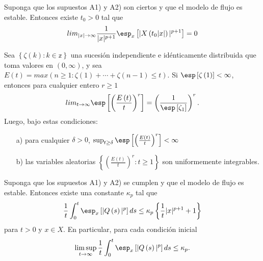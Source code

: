\begin{Prop}\label{Prop.5.1.DaiSean}
Suponga que los supuestos A1) y A2) son ciertos y que el modelo de flujo es estable. Entonces existe $t_{0}>0$ tal que
\begin{equation}
lim_{|x|\rightarrow\infty}\frac{1}{|x|^{p+1}}\esp_{x}\left[|X\left(t_{0}|x|\right)|^{p+1}\right]=0
\end{equation}
\end{Prop}

\begin{Lemma}\label{Lema.5.2.DaiSean}
 Sea $\left\{\zeta\left(k\right):k\in \mathbb{z}\right\}$ una sucesi\'on independiente e id\'enticamente distribuida que toma valores en $\left(0,\infty\right)$,
y sea
$E\left(t\right)=max\left(n\geq1:\zeta\left(1\right)+\cdots+\zeta\left(n-1\right)\leq
t\right)$. Si $\esp\left[\zeta\left(1\right)\right]<\infty$,
entonces para cualquier entero $r\geq1$
\begin{equation}
 lim_{t\rightarrow\infty}\esp\left[\left(\frac{E\left(t\right)}{t}\right)^{r}\right]=\left(\frac{1}{\esp\left[\zeta_{1}\right]}\right)^{r}.
\end{equation}
Luego, bajo estas condiciones:
\begin{itemize}
 \item[a)] para cualquier $\delta>0$, $\sup_{t\geq\delta}\esp\left[\left(\frac{E\left(t\right)}{t}\right)^{r}\right]<\infty$
\item[b)] las variables aleatorias
$\left\{\left(\frac{E\left(t\right)}{t}\right)^{r}:t\geq1\right\}$
son uniformemente integrables.
\end{itemize}
\end{Lemma}

\begin{Teo}\label{Tma.5.5.DaiSean}
Suponga que los supuestos A1) y A2) se cumplen y que el modelo de
flujo es estable. Entonces existe una constante $\kappa_{p}$ tal
que
\begin{equation}
\frac{1}{t}\int_{0}^{t}\esp_{x}\left[|Q\left(s\right)|^{p}\right]ds\leq\kappa_{p}\left\{\frac{1}{t}|x|^{p+1}+1\right\}
\end{equation}
para $t>0$ y $x\in X$. En particular, para cada condici\'on
inicial
\begin{eqnarray*}
\limsup_{t\rightarrow\infty}\frac{1}{t}\int_{0}^{t}\esp_{x}\left[|Q\left(s\right)|^{p}\right]ds\leq\kappa_{p}.
\end{eqnarray*}
\end{Teo}

